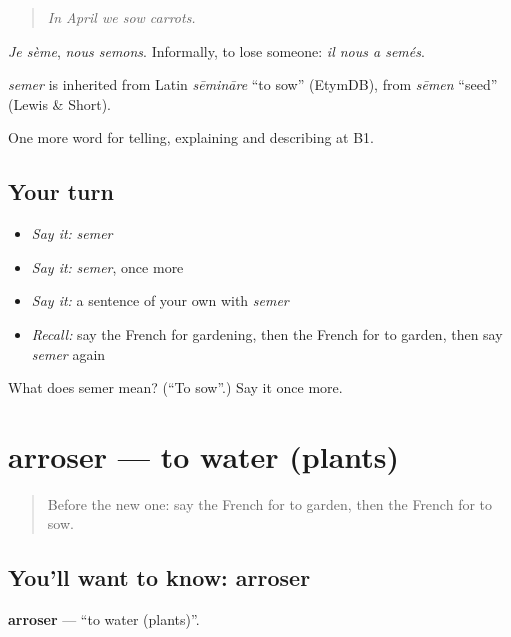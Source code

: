 \begin{quote}
\emph{In April we sow carrots.}
\end{quote}

\emph{Je sème}, \emph{nous semons}. Informally, to lose someone: \emph{il nous a semés}.

\begin{cousinweb}
\emph{semer} is inherited from Latin \emph{sēmināre} \textquotedblleft{}to sow\textquotedblright{} (EtymDB), from \emph{sēmen} \textquotedblleft{}seed\textquotedblright{} (Lewis \& Short).
\end{cousinweb}

\begin{grammarlens}[title={What you've built}]
One more word for telling, explaining and describing at B1.
\end{grammarlens}

\subsection*{Your turn}
\begin{itemize}
\raggedright
  \item \emph{Say it:} \emph{semer}
  \item \emph{Say it:} \emph{semer}, once more
  \item \emph{Say it:} a sentence of your own with \emph{semer}
  \item \emph{Recall:} say the French for gardening, then the French for to garden, then say \emph{semer} again
\end{itemize}

\begin{tcolorbox}[breakable,colback=teal!4,colframe=teal!35!black,title={Before you move on}]
What does semer mean? (\textquotedblleft{}To sow\textquotedblright{}.) Say it once more.
\end{tcolorbox}
\section[arroser]{arroser — to water (plants)}

\label{lesson:FR-C503-arroser}



\begin{quote}
Before the new one: say the French for to garden, then the French for to sow.
\end{quote}

\subsection*{You'll want to know: arroser}
\textbf{arroser} — \textquotedblleft{}to water (plants)\textquotedblright{}.

